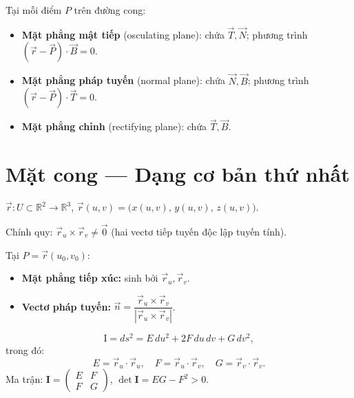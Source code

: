 \documentclass[12pt,a4paper]{article}
\begin{document}
\begin{dinhnghia}[title={Các mặt phẳng đặc biệt}]
  Tại mỗi điểm $P$ trên đường cong:
  \begin{itemize}
    \item \textbf{Mặt phẳng mật tiếp} (osculating plane): chứa $\vec{T}, \vec{N}$; phương trình $(\vec{r} - \vec{P}) \cdot \vec{B} = 0$.
    \item \textbf{Mặt phẳng pháp tuyến} (normal plane): chứa $\vec{N}, \vec{B}$; phương trình $(\vec{r} - \vec{P}) \cdot \vec{T} = 0$.
    \item \textbf{Mặt phẳng chỉnh} (rectifying plane): chứa $\vec{T}, \vec{B}$.
  \end{itemize}
\end{dinhnghia}

\section{Mặt cong --- Dạng cơ bản thứ nhất}

\begin{dinhnghia}[title={Mặt tham số}]
  $\vec{r}: U \subset \mathbb{R}^2 \to \mathbb{R}^3$, $\vec{r}(u, v) = \bigl(x(u,v),\, y(u,v),\, z(u,v)\bigr)$.

  Chính quy: $\vec{r}_u \times \vec{r}_v \ne \vec{0}$ (hai vectơ tiếp tuyến độc lập tuyến tính).
\end{dinhnghia}

\begin{dinhnghia}[title={Mặt phẳng tiếp xúc và pháp tuyến}]
  Tại $P = \vec{r}(u_0, v_0)$:
  \begin{itemize}
    \item \textbf{Mặt phẳng tiếp xúc:} sinh bởi $\vec{r}_u, \vec{r}_v$.
    \item \textbf{Vectơ pháp tuyến:} $\vec{n} = \dfrac{\vec{r}_u \times \vec{r}_v}{|\vec{r}_u \times \vec{r}_v|}$.
  \end{itemize}
\end{dinhnghia}

\begin{dinhnghia}[title={Dạng cơ bản thứ nhất (First Fundamental Form)}]
  \[
    \mathrm{I} = ds^2 = E\,du^2 + 2F\,du\,dv + G\,dv^2,
  \]
  trong đó:
  \[
    E = \vec{r}_u \cdot \vec{r}_u, \quad F = \vec{r}_u \cdot \vec{r}_v, \quad G = \vec{r}_v \cdot \vec{r}_v.
  \]
  Ma trận: $\mathbf{I} = \begin{pmatrix} E & F \\ F & G \end{pmatrix}$, $\det \mathbf{I} = EG - F^2 > 0$.
\end{dinhnghia}
\end{document}
